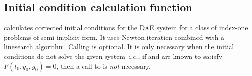 
\subsection{Initial condition calculation function}\label{ss:idacalcic}

 calculates corrected initial conditions for the DAE 
system for a class of index-one problems of semi-implicit form.
It uses Newton iteration combined with a linesearch algorithm.
Calling  is optional. It is only necessary when the  
initial conditions do not solve the given system;  i.e., if   
 and  are known to satisfy $F(t_0, y_0, y^\prime_0) = 0$, 
then a call to  is {\em not} necessary.

